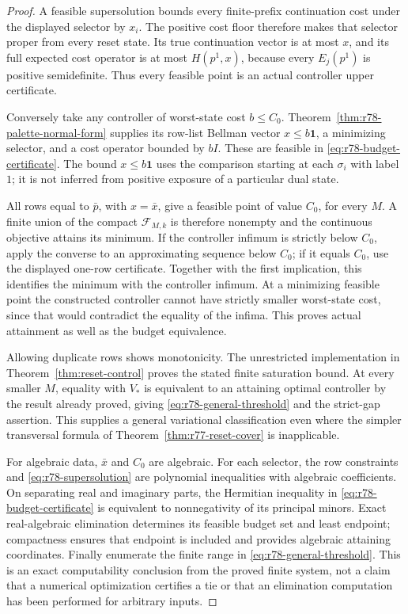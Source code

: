 \begin{proof}
A feasible supersolution bounds every finite-prefix continuation
cost under the displayed selector by $x_i$.  The positive cost floor
therefore makes that selector proper from every reset state.  Its
true continuation vector is at most $x$, and its full expected cost
operator is at most $H(p^1,x)$, because every $E_j(p^1)$ is positive
semidefinite.  Thus every feasible point is an actual controller
upper certificate.

Conversely take any controller of worst-state cost $b\le C_0$.
Theorem~\ref{thm:r78-palette-normal-form} supplies its row-list
Bellman vector $x\le b\mathbf1$, a minimizing selector, and a
cost operator bounded by $bI$.  These are feasible in
\eqref{eq:r78-budget-certificate}.  The bound $x\le b\mathbf1$
uses the comparison starting at each $\sigma_i$ with label $1$;
it is not inferred from positive exposure of a particular dual state.

All rows equal to $\bar p$, with $x=\bar x$, give a feasible point
of value $C_0$, for every $M$.  A finite union of the compact
$\mathcal F_{M,k}$ is therefore nonempty and the continuous
objective attains its minimum.  If the controller infimum is strictly below $C_0$, apply the converse
to an approximating sequence below $C_0$; if it equals $C_0$, use
the displayed one-row certificate.  Together with the first implication,
this identifies the minimum with the controller infimum.  At a minimizing feasible
point the constructed controller cannot have strictly smaller
worst-state cost, since that would contradict the equality of the
infima.  This proves actual attainment as well as the budget
equivalence.

Allowing duplicate rows shows monotonicity.  The unrestricted
implementation in Theorem~\ref{thm:reset-control} proves the stated
finite saturation bound.  At every smaller $M$, equality with $V_*$
is equivalent to an attaining optimal controller by the result
already proved, giving \eqref{eq:r78-general-threshold} and the
strict-gap assertion.  This supplies a general variational
classification even where the simpler transversal formula of
Theorem~\ref{thm:r77-reset-cover} is inapplicable.

For algebraic data, $\bar x$ and $C_0$ are algebraic.  For each
selector, the row constraints and
\eqref{eq:r78-supersolution} are polynomial inequalities with
algebraic coefficients.  On separating real and imaginary parts,
the Hermitian inequality in \eqref{eq:r78-budget-certificate} is
equivalent to nonnegativity of its principal minors.  Exact
real-algebraic elimination determines its feasible budget set and
least endpoint; compactness ensures that endpoint is included and
provides algebraic attaining coordinates.  Finally enumerate the
finite range in \eqref{eq:r78-general-threshold}.  This is an exact
computability conclusion from the proved finite system, not a
claim that a numerical optimization certifies a tie or that an
elimination computation has been performed for arbitrary inputs.
\end{proof}

